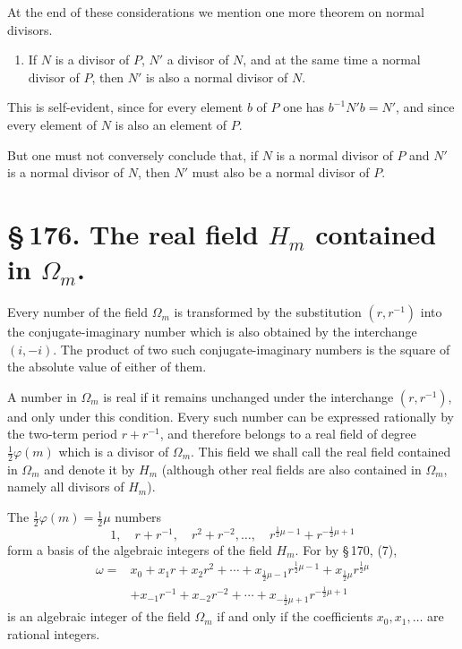 \documentclass[11pt]{article}
\begin{document}
At the end of these considerations we mention one more theorem on normal divisors.
\begin{enumerate}[resume,label=\arabic*.]
\item If $N$ is a divisor of $P$, $N'$ a divisor of $N$, and at the same time a normal divisor of $P$, then $N'$ is also a normal divisor of $N$.
\end{enumerate}
This is self-evident, since for every element $b$ of $P$ one has $b^{-1}N'b=N'$, and since every element of $N$ is also an element of $P$.

But one must not conversely conclude that, if $N$ is a normal divisor of $P$ and $N'$ is a normal divisor of $N$, then $N'$ must also be a normal divisor of $P$.
\clearpage
\section*{\S\,176. The real field $H_m$ contained in $\Omega_m$.}

Every number of the field $\Omega_m$ is transformed by the substitution $(r,r^{-1})$ into the conjugate-imaginary number which is also obtained by the interchange $(i,-i)$. The product of two such conjugate-imaginary numbers is the square of the absolute value of either of them.

A number in $\Omega_m$ is real if it remains unchanged under the interchange $(r,r^{-1})$, and only under this condition. Every such number can be expressed rationally by the two-term period $r+r^{-1}$, and therefore belongs to a real field of degree $\frac12\varphi(m)$ which is a divisor of $\Omega_m$. This field we shall call the real field contained in $\Omega_m$ and denote it by $H_m$ (although other real fields are also contained in $\Omega_m$, namely all divisors of $H_m$).

The $\frac12\varphi(m)=\frac12\mu$ numbers
\begin{equation}
1,\quad r+r^{-1},\quad r^2+r^{-2},\ldots,\quad r^{\frac12\mu-1}+r^{-\frac12\mu+1}
\tag{1}
\end{equation}
form a basis of the algebraic integers of the field $H_m$. For by \S\,170, (7),
\begin{equation}
\begin{aligned}
\omega={}&x_0+x_1r+x_2r^2+\cdots+x_{\frac12\mu-1}r^{\frac12\mu-1}+x_{\frac12\mu}r^{\frac12\mu} \\
&+x_{-1}r^{-1}+x_{-2}r^{-2}+\cdots+x_{-\frac12\mu+1}r^{-\frac12\mu+1}
\end{aligned}
\tag{2}
\end{equation}
is an algebraic integer of the field $\Omega_m$ if and only if the coefficients $x_0,x_1,
\ldots$ are rational integers.
\end{document}
